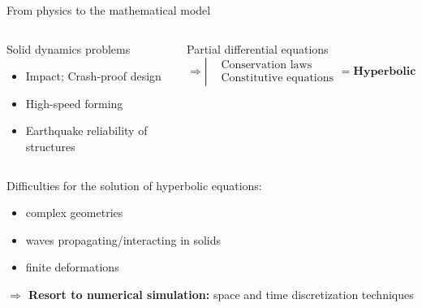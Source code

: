 \begin{frame}{From physics to the mathematical model}
\begin{overprint}
    \begin{columns}
      \begin{column}{0.45\textwidth}
        \begin{block}{Solid dynamics problems}
          \begin{itemize}
          \item[] Impact; Crash-proof design
          \item[] High-speed forming
          \item[] Earthquake reliability of structures 
          \end{itemize}
        \end{block}
      \end{column}
      
      \begin{column}{0.55\textwidth}
        \begin{block}{Partial differential equations}
          \begin{equation*}
            \Rightarrow \left\lvert
              \begin{aligned}
                & \text{Conservation laws} \\
                & \text{Constitutive equations} 
              \end{aligned}
            \right. = \textbf{Hyperbolic system}
          \end{equation*}
        \end{block}
      \end{column}
    \end{columns}
    
    \begin{block}{Difficulties for the solution of hyperbolic equations:}
      \begin{itemize}
      \item complex geometries
      \item waves propagating/interacting in solids \cite{Wang}
      \item finite deformations
      \end{itemize}
    \end{block}
    \textbf{$\Rightarrow$ Resort to numerical simulation:} space and time discretization techniques
  \end{overprint}
  
\end{frame}

